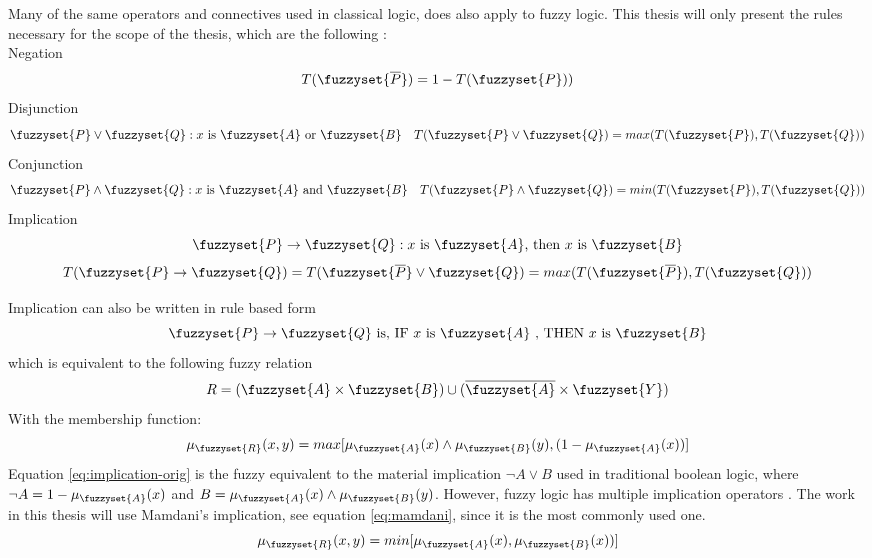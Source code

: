 Many of the same operators and connectives used in classical logic, does also apply to fuzzy logic. This thesis will only present the rules necessary for the scope of the thesis, which are the following \cite{ross2009fuzzy}:\\
\noindent Negation
\begin{equation}
    T(\fuzzyset{\overline{P}})=1-T(\fuzzyset{P})) {}\label{eq:negation}
\end{equation}
Disjunction
\begin{equation}
    \fuzzyset{P}\lor \fuzzyset{Q}:x \text{ is } \fuzzyset{A} \text{ or } \fuzzyset{B}\quad T(\fuzzyset{P} \lor \fuzzyset{Q})=max(T(\fuzzyset{P}),T(\fuzzyset{Q}))\label{eq:disjunction}
\end{equation}
Conjunction
\begin{equation}
    \fuzzyset{P}\land \fuzzyset{Q}:x \text{ is } \fuzzyset{A} \text{ and } \fuzzyset{B}\quad T(\fuzzyset{P} \land \fuzzyset{Q})=min(T(\fuzzyset{P}),T(\fuzzyset{Q}))\label{eq:conjunction}
\end{equation}
Implication
\begin{equation}
    \fuzzyset{P}\to \fuzzyset{Q}: x \text{ is } \fuzzyset{A} \text{, then }x \text{ is } \fuzzyset{B}
    \label{eq:implication}
\end{equation}
\[ T(\fuzzyset{P}\to \fuzzyset{Q})=T(\fuzzyset{\overline{P}}\lor\fuzzyset{Q})=max(T(\fuzzyset{\overline{P}}),T(\fuzzyset{Q}))  \]

\noindent Implication can also be written in rule based form
\[ \fuzzyset{P} \to \fuzzyset{Q} \text{ is,  IF } x \text{ is } \fuzzyset{A} \text{ , THEN } x \text{ is } \fuzzyset{B}\]
which is equivalent to the following fuzzy relation
\[  R=(\fuzzyset{A}\times\fuzzyset{B})\cup (\overline{\fuzzyset{A}}\times \fuzzyset{Y})\]
\noindent With the membership function:
\begin{equation}
    \mu_{\fuzzyset{R}}(x,y)=max[\mu_{\fuzzyset{A}}(x)\land\mu_{\fuzzyset{B}}(y),(1-\mu_{\fuzzyset{A}}(x))]
    \label{eq:implication-orig}
\end{equation}
Equation \ref{eq:implication-orig} is the fuzzy equivalent to the material implication  $\neg A \lor B$ used in traditional boolean logic\cite{ying2002implication}, where $\neg A = 1-\mu_{\fuzzyset{A}}(x)  $ and $B = \mu_{\fuzzyset{A}}(x)\land\mu_{\fuzzyset{B}}(y)$. However, fuzzy logic has multiple implication operators \cite{ross2009fuzzy}. The work in this thesis will use Mamdani's implication, see equation \ref{eq:mamdani}, since it is the most commonly used one.
\begin{equation}
    \mu_{\fuzzyset{R}}(x,y)=min[\mu_{\fuzzyset{A}}(x),\mu_{\fuzzyset{B}}(x))]
    \label{eq:mamdani}
\end{equation}




